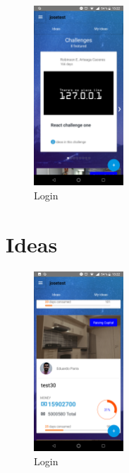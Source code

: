 \begin{figure}[!h]
	\begin{center}
		\includegraphics[width=0.3\textwidth]{./img/anexo1/inicio.png}
		\caption{Login}
		\label{fig:inicio}
	\end{center}
\end{figure}

\section{Ideas}

\begin{figure}[!h]
	\begin{center}
		\includegraphics[width=0.3\textwidth]{./img/anexo1/inicio_mis_ideas.png}
		\caption{Login}
		\label{fig:inicio_mis_ideas}
	\end{center}
\end{figure}

